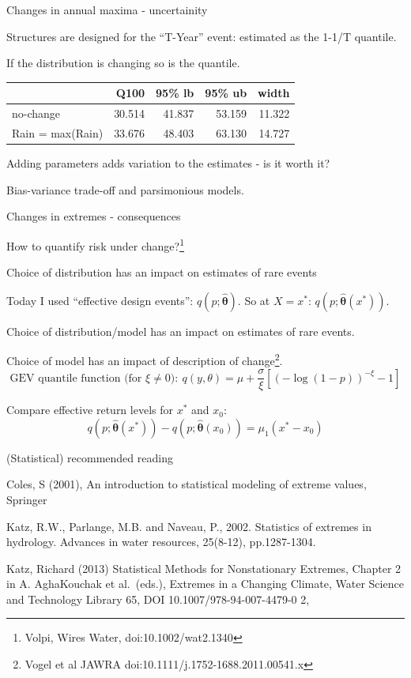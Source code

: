 \documentclass[
  10pt,
  ignorenonframetext,
  compress]{beamer}
\begin{document}
\begin{frame}{Changes in annual maxima - uncertainity}
\protect\hypertarget{changes-in-annual-maxima---uncertainity}{}

Structures are designed for the ``T-Year'' event: estimated as the 1-1/T
quantile.

If the distribution is changing so is the quantile.

\pause

\begin{longtable}[]{@{}lrrrr@{}}
\toprule
& Q100 & 95\% lb & 95\% ub & width\tabularnewline
\midrule
\endhead
no-change & 30.514 & 41.837 & 53.159 & 11.322\tabularnewline
Rain = max(Rain) & 33.676 & 48.403 & 63.130 & 14.727\tabularnewline
\bottomrule
\end{longtable}

Adding parameters adds variation to the estimates - is it worth it?

\pause

Bias-variance trade-off and parsimonious models.

\end{frame}

\begin{frame}{Changes in extremes - consequences}
\protect\hypertarget{changes-in-extremes---consequences}{}

How to quantify risk under
change?\footnote{Volpi, Wires Water, doi:10.1002/wat2.1340}

Choice of distribution has an impact on estimates of rare events

Today I used ``effective design events'':
\(q(p; \hat{\boldsymbol \theta})\). So at \(X=x^{*}\):
\(q(p; \hat{\boldsymbol \theta}(x^{*}))\).

Choice of distribution/model has an impact on estimates of rare events.

Choice of model has an impact of description of
change\footnote{Vogel et al JAWRA doi:10.1111/j.1752-1688.2011.00541.x}.
\[\text{GEV quantile function (for $\xi \neq 0$)}: \ q(y, \theta) = \mu + \frac{\sigma}{\xi} \left[(-\log(1-p))^{-\xi} -1 \right] \]

Compare effective return levels for \(x^{*}\) and \(x_0\):
\[q(p; \hat{\boldsymbol \theta}(x^{*})) - q(p; \hat{\boldsymbol \theta}(x_0)) = \mu_1 (x^{*}-x_0)\]

\end{frame}

\begin{frame}{(Statistical) recommended reading}
\protect\hypertarget{statistical-recommended-reading}{}

Coles, S (2001), An introduction to statistical modeling of extreme
values, Springer

Katz, R.W., Parlange, M.B. and Naveau, P., 2002. Statistics of extremes
in hydrology. Advances in water resources, 25(8-12), pp.1287-1304.

Katz, Richard (2013) Statistical Methods for Nonstationary Extremes,
Chapter 2 in A. AghaKouchak et al.~(eds.), Extremes in a Changing
Climate, Water Science and Technology Library 65, DOI
10.1007/978-94-007-4479-0 2,

\end{frame}
\end{document}
